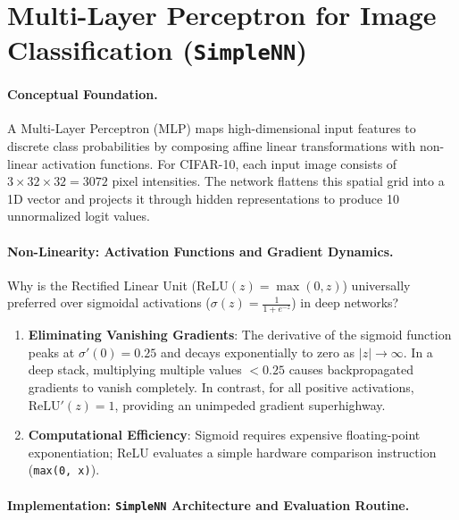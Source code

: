 \documentclass[11pt,a4paper]{article}
\begin{document}
\clearpage

\section[Multi-Layer Perceptron: SimpleNN]{Multi-Layer Perceptron for Image Classification (\texttt{SimpleNN})}

\paragraph{Conceptual Foundation.}
A Multi-Layer Perceptron (MLP) maps high-dimensional input features to discrete class probabilities by composing affine linear transformations with non-linear activation functions. For CIFAR-10, each input image consists of $3 \times 32 \times 32 = 3072$ pixel intensities. The network flattens this spatial grid into a 1D vector and projects it through hidden representations to produce 10 unnormalized logit values.

\paragraph{Non-Linearity: Activation Functions and Gradient Dynamics.}
Why is the Rectified Linear Unit ($\text{ReLU}(z) = \max(0, z)$) universally preferred over sigmoidal activations ($\sigma(z) = \frac{1}{1 + e^{-z}}$) in deep networks?

\begin{enumerate}
    \item \textbf{Eliminating Vanishing Gradients}: The derivative of the sigmoid function peaks at $\sigma'(0) = 0.25$ and decays exponentially to zero as $|z| \to \infty$. In a deep stack, multiplying multiple values $<0.25$ causes backpropagated gradients to vanish completely. In contrast, for all positive activations, $\text{ReLU}'(z) = 1$, providing an unimpeded gradient superhighway.
    \item \textbf{Computational Efficiency}: Sigmoid requires expensive floating-point exponentiation; ReLU evaluates a simple hardware comparison instruction (\texttt{max(0, x)}).
\end{enumerate}

\paragraph{Implementation: \texttt{SimpleNN} Architecture and Evaluation Routine.}
\end{document}
